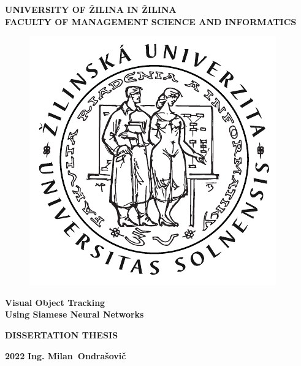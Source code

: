 \begin{titlepage}
    \begin{center}
        \normalsize
        \textbf{UNIVERSITY OF ŽILINA IN ŽILINA}\\
        \textbf{FACULTY OF MANAGEMENT SCIENCE AND INFORMATICS}\\

        \begin{figure}[!h]
            \centerline{\includegraphics[width=0.25\linewidth]{figures/formal_pages/FRI_logo.pdf}}
        \end{figure}

        \vfill

        \LARGE
        \textbf{Visual Object Tracking\\Using Siamese Neural Networks}

        \vspace{1cm}

        \Large
        \textbf{DISSERTATION THESIS}
    \end{center}

    \vfill

    \normalsize

    \textbf{2022} \hfill \textbf{Ing. Milan~Ondra\v{s}ovi\v{c}}

\end{titlepage}
